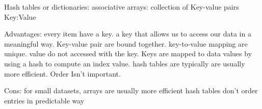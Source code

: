 Hash tables or dictionaries:
  associative arrays:
    collection of Key-value pairs 
    Key:Value

  Advantages:
    every item have a key. 
    a key that allows us to access our data in a meaningful way.
    Key-value pair are bound together.
    key-to-value mapping are unique.
    value do not accessed with the key.
    Keys are mapped to data values by using a hash to compute an index value.
    hash tables are typically are usually more efficient.
    Order Isn't important.
    

  Cons: 
    for small datasets, arrays are usually more efficient
    hash tables don't order entries in predictable way 
